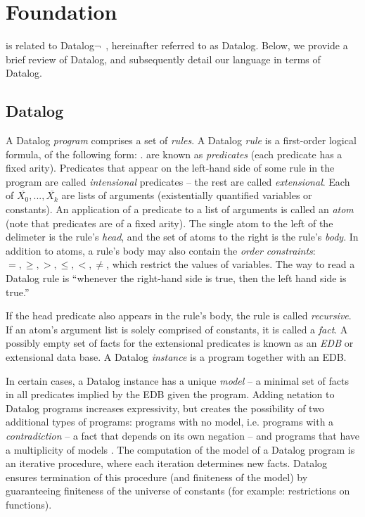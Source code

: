 \section{Foundation}
\label{sec:lang}

\lang is related to Datalog$\lnot$~\cite{ullmanbook}, hereinafter referred to as Datalog.  Below, we provide a brief review of Datalog, and subsequently detail our language in terms of Datalog.

\subsection{Datalog}
\label{sec:datalog}

A Datalog {\em program} comprises a set of {\em rules}.  A Datalog {\em rule} is a first-order logical formula, of the following form: .   are known as {\em predicates} (each predicate has a fixed arity).  Predicates that appear on the left-hand side of some rule in the program are called {\em intensional} predicates -- the rest are called {\em extensional}.  Each of $\overline{X_0}, ..., \overline{X_k}$ are lists of arguments (existentially quantified variables or constants).  An application of a predicate to a list of arguments is called an {\em atom} (note that predicates are of a fixed arity).  The single atom to the left of the \dedalus{:-} delimeter is the rule's {\em head}, and the set of atoms to the right is the rule's {\em body}.  In addition to atoms, a rule's body may also contain the {\em order constraints}: $=, \geq, >, \leq, <, \neq$, which restrict the values of variables.  The way to read a Datalog rule is ``whenever the right-hand side is true, then the left hand side is true.''

If the head predicate also appears in the rule's body, the rule is called {\em recursive}.  If an atom's argument list is solely comprised of constants, it is called a {\em fact}.  A possibly empty set of facts for the extensional predicates is known as an {\em EDB} or extensional data base.  A Datalog {\em instance} is a program together with an EDB.

In certain cases, a Datalog instance has a unique {\em model}  -- a minimal set of facts in all predicates implied by the EDB given the program.  Adding netation to Datalog programs increases expressivity, but creates the possibility of two additional types of programs: programs with no model, i.e. programs with a {\em contradiction} -- a fact that depends on its own negation -- and programs that have a multiplicity of models .  The computation of the model of a Datalog program is an iterative procedure, where each iteration determines new facts.  Datalog ensures termination of this procedure (and finiteness of the model) by guaranteeing finiteness of the universe of constants (for example: restrictions on functions).

